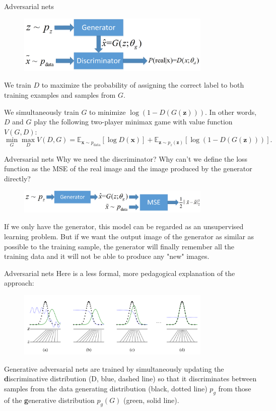 \documentclass[10pt]{beamer}
\begin{document}
	\begin{frame}{Adversarial nets}
		\begin{figure}
			\includegraphics[width=25em]{figures/GAN-general-structure.png}
		\end{figure}
		We train $D$ to maximize the probability of assigning the correct label to both training examples and samples from $G$.
	
		We simultaneously train $G$ to minimize $\log(1-D(G(\bm{z})))$. In other words, $D$ and $G$ play the following two-player minimax game with value function $V(G,D)$:
		$$
		\mathop{\min}_{G}\mathop{\max}_{D}V(D,G)=\mathbb{E}_{\bm{x}\sim p_{\text{data}}}\left[\log D(\bm{x})\right]+\mathbb{E}_{\bm{z}\sim p_z(\bm{z})}\left[\log(1-D(G(\bm{z})))\right].
		$$
		
	\end{frame}

	\begin{frame}{Adversarial nets}
		Why we need the discriminator? Why can't we define the loss function as the MSE of the real image and the image produced by the generator directly?
		\begin{figure}
			\includegraphics[width=25em]{figures/GAN-hypothesis-structure.png}
		\end{figure}
		If we only have the generator, this model can be regarded as an unsupervised learning problem. But if we want the output image of the generator as similar as possible to the training sample, the generator will finally remember all the training data and it will not be able to produce any "new" images.
	\end{frame}

	\begin{frame}[t]{Adversarial nets}
		Here is a less formal, more pedagogical explanation of the approach:
		\begin{figure}
			\includegraphics[width=25em]{figures/GAN-pedagogical-explanation.png}
		\end{figure}
		Generative adversarial nets are trained by simultaneously updating the \textbf{d}iscriminative distribution (D, blue, dashed line) so that it discriminates between samples from the data generating distribution (black, dotted line) $p_g$ from those of the \textbf{g}enerative distribution $p_g(G)$ (green, solid line). 
	\end{frame}
	
\end{document}
